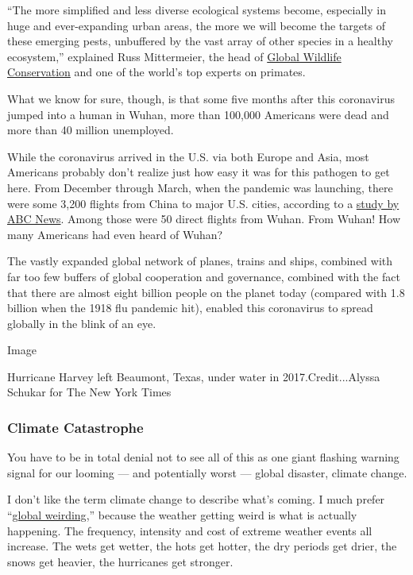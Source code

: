 ``The more simplified and less diverse ecological systems become,
especially in huge and ever-expanding urban areas, the more we will
become the targets of these emerging pests, unbuffered by the vast array
of other species in a healthy ecosystem,'' explained Russ Mittermeier,
the head of
\href{https://www.globalwildlife.org/blog/coronaviruses-and-the-human-meat-market/}{Global
Wildlife Conservation} and one of the world's top experts on primates.

What we know for sure, though, is that some five months after this
coronavirus jumped into a human in Wuhan, more than 100,000 Americans
were dead and more than 40 million unemployed.

While the coronavirus arrived in the U.S. via both Europe and Asia, most
Americans probably don't realize just how easy it was for this pathogen
to get here. From December through March, when the pandemic was
launching, there were some 3,200 flights from China to major U.S.
cities, according to a
\href{https://abcnews.go.com/Health/disaster-motion-flights-coronavirus-ravaged-countries-landed-us/story?id=70025470}{study
by ABC News}. Among those were 50 direct flights from Wuhan. From Wuhan!
How many Americans had even heard of Wuhan?

The vastly expanded global network of planes, trains and ships, combined
with far too few buffers of global cooperation and governance, combined
with the fact that there are almost eight billion people on the planet
today (compared with 1.8 billion when the 1918 flu pandemic hit),
enabled this coronavirus to spread globally in the blink of an eye.

Image

Hurricane Harvey left Beaumont, Texas, under water in
2017.Credit...Alyssa Schukar for The New York Times

\hypertarget{climate-catastrophe}{%
\subsubsection{Climate Catastrophe}\label{climate-catastrophe}}

You have to be in total denial not to see all of this as one giant
flashing warning signal for our looming --- and potentially worst ---
global disaster, climate change.

I don't like the term climate change to describe what's coming. I much
prefer
``\href{https://www.thenewhumanitarian.org/news/2009/02/05}{global
weirding},'' because the weather getting weird is what is actually
happening. The frequency, intensity and cost of extreme weather events
all increase. The wets get wetter, the hots get hotter, the dry periods
get drier, the snows get heavier, the hurricanes get stronger.

